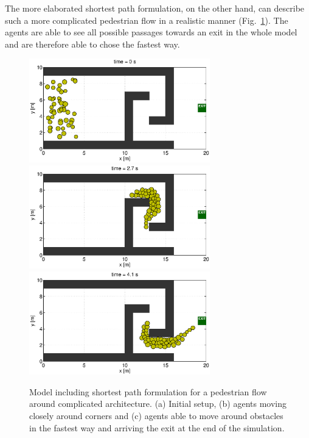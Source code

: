 \documentclass[11pt]{article}
\begin{document}
The more elaborated shortest path formulation, on the other hand, can describe such a more complicated pedestrian flow in a realistic manner (Fig.~\ref{fig:simple4}). The agents are able to see all possible passages towards an exit in the whole model and are therefore able to chose the fastest way.

\begin{figure}
	\begin{center}
	\includegraphics[width=0.7\textwidth]
	{figures/Model2_fastest_1_000000.eps}
	\qquad
	\includegraphics[width=0.7\textwidth]
	{figures/Model2_fastest_1_000270.eps}
	\qquad
	\includegraphics[width=0.7\textwidth]
	{figures/Model2_fastest_1_000410.eps}
	\caption{Model including shortest path formulation for a pedestrian flow around complicated architecture. (a) Initial setup, (b) agents moving closely around corners and (c) agents able to move around obstacles in the fastest way and arriving the exit at the end of the simulation.}
	\label{fig:simple4}
	\end{center}
\end{figure}
\end{document}
